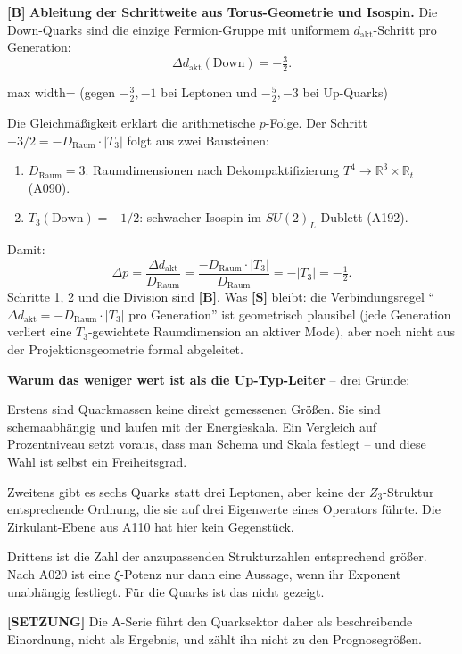 \textbf{[B]} \textbf{Ableitung der Schrittweite aus Torus-Geometrie
und Isospin.} Die Down-Quarks sind die einzige Fermion-Gruppe mit uniformem
$d_\text{akt}$-Schritt pro Generation:
\[
  \Delta d_\text{akt}(\text{Down}) = -\tfrac32.
\]
\begin{adjustbox}{max width=\linewidth}%
\small(gegen $-\tfrac32,-1$ bei Leptonen und $-\tfrac52,-3$ bei Up-Quarks)%
\end{adjustbox}
Die Gleichmäßigkeit erklärt die arithmetische $p$-Folge. Der Schritt
$-3/2 = -D_\text{Raum}\cdot|T_3|$ folgt aus zwei Bausteinen:
\begin{enumerate}[leftmargin=2em,itemsep=1pt,topsep=2pt]
  \item $D_\text{Raum}=3$: Raumdimensionen nach Dekompaktifizierung
    $T^4\to\mathbb{R}^3\times\mathbb{R}_t$ (A090).
  \item $T_3(\text{Down})=-1/2$: schwacher Isospin im $SU(2)_L$-Dublett
    (A192).
\end{enumerate}
Damit:
\[
  \Delta p = \frac{\Delta d_\text{akt}}{D_\text{Raum}}
  = \frac{-D_\text{Raum}\cdot|T_3|}{D_\text{Raum}} = -|T_3| = -\tfrac12.
\]
Schritte 1, 2 und die Division sind \textbf{[B]}. Was \textbf{[S]} bleibt:
die Verbindungsregel ``$\Delta d_\text{akt} = -D_\text{Raum}\cdot|T_3|$
pro Generation'' ist geometrisch plausibel (jede Generation verliert eine
$T_3$-gewichtete Raumdimension an aktiver Mode), aber noch nicht aus
der Projektionsgeometrie formal abgeleitet.

\textbf{Warum das weniger wert ist als die Up-Typ-Leiter} -- drei Gründe:

Erstens sind Quarkmassen keine direkt gemessenen Größen. Sie sind
schemaabhängig und laufen mit der Energieskala. Ein Vergleich auf Prozentniveau
setzt voraus, dass man Schema und Skala festlegt -- und diese Wahl ist selbst
ein Freiheitsgrad.

Zweitens gibt es sechs Quarks statt drei Leptonen, aber keine der
$Z_3$-Struktur entsprechende Ordnung, die sie auf drei Eigenwerte eines
Operators führte. Die Zirkulant-Ebene aus A110 hat hier kein Gegenstück.

Drittens ist die Zahl der anzupassenden Strukturzahlen entsprechend größer.
Nach A020 ist eine $\xi$-Potenz nur dann eine Aussage, wenn ihr Exponent
unabhängig festliegt. Für die Quarks ist das nicht gezeigt.

\textbf{[SETZUNG]} Die A-Serie führt den Quarksektor daher als beschreibende
Einordnung, nicht als Ergebnis, und zählt ihn nicht zu den Prognosegrößen.

